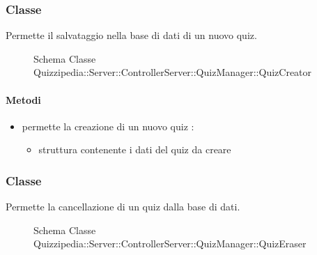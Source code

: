 \subsubsection{Classe }
Permette il salvataggio nella base di dati di un nuovo quiz.
\begin{figure}[H]
\centering
\noindent{}
\caption[Schema Classe QuizCreator]{Schema Classe Quizzipedia::Server::ControllerServer::QuizManager::QuizCreator}
\end{figure}
\paragraph{Metodi}
\begin{itemize}
\item {}
\newline
permette la creazione di un nuovo quiz
\newline
{} :
\begin{itemize}
\item {}
\newline
struttura contenente i dati del quiz da creare
\end{itemize}
\end{itemize}
\subsubsection{Classe }
Permette la cancellazione di un quiz dalla base di dati.
\begin{figure}[H]
\centering
\noindent{}
\caption[Schema Classe QuizEraser]{Schema Classe Quizzipedia::Server::ControllerServer::QuizManager::QuizEraser}
\end{figure}
